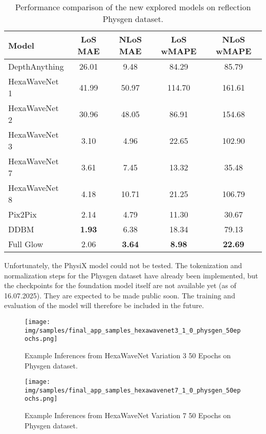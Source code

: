 		\begin{table}[h!]
			\centering
			\begin{tabular}{|l|c|c|c|c|}
				\hline
				\textbf{Model} & \textbf{LoS MAE} & \textbf{NLoS MAE} & \textbf{LoS wMAPE} & \textbf{NLoS wMAPE} \\
				\hline
				DepthAnything & 26.01 & 9.48 & 84.29 & 85.79 \\
				HexaWaveNet 1 & 41.99 & 50.97 & 114.70 & 161.61 \\
				HexaWaveNet 2 & 30.96 & 48.05 & 86.91 & 154.68 \\
				HexaWaveNet 3 & 3.10 & 4.96 & 22.65 & 102.90 \\
				HexaWaveNet 7 & 3.61 & 7.45 & 13.32 & 35.48 \\
				HexaWaveNet 8 & 4.18 & 10.71 & 21.25 & 106.79 \\
				Pix2Pix & 2.14 & 4.79 & 11.30 & 30.67 \\
				DDBM & \textbf{1.93} & 6.38 & 18.34 & 79.13 \\
				Full Glow & 2.06 & \textbf{3.64} & \textbf{8.98} & \textbf{22.69} \\
				\hline
			\end{tabular}
			\caption{Performance comparison of the new explored models on reflection Physgen dataset.}
			\label{tab:experiment_architecture_results}
		\end{table}
		\FloatBarrier
		Unfortunately, the PhysiX model could not be tested. The tokenization and normalization steps for the Physgen dataset have already been implemented, but the checkpoints for the foundation model itself are not available yet (as of 16.07.2025). They are expected to be made public soon. The training and evaluation of the model will therefore be included in the future.
		
		\begin{figure}[H]
			\centering
			\texttt{[image: img/samples/final\_app\_samples\_hexawavenet3\_1\_0\_physgen\_50epochs.png]}
			\caption[Example Inferences from HexaWaveNet Variation 3 50 Epochs on Physgen dataset.]{Example Inferences from HexaWaveNet Variation 3 50 Epochs on Physgen dataset.}
			\label{fig:experiment_architecture_hexa_3_examples}
		\end{figure}
		\FloatBarrier
		
		\begin{figure}[H]
			\centering
			\texttt{[image: img/samples/final\_app\_samples\_hexawavenet7\_1\_0\_physgen\_50epochs.png]}
			\caption[Example Inferences from HexaWaveNet Variation 7 50 Epochs on Physgen dataset.]{Example Inferences from HexaWaveNet Variation 7 50 Epochs on Physgen dataset.}
			\label{fig:experiment_architecture_hexa_7_examples}
		\end{figure}
		\FloatBarrier
		
